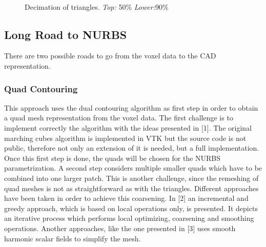 \begin{figure}
\centering
   \\
   \caption{Decimation of triangles. \textit{Top:} 50\% \textit{Lower:}90\%}
   \label{fig:Decimation}
\end{figure}

\subsection{Long Road to NURBS}
There are two possible roads to go from the voxel data to the CAD representation.
\subsubsection{Quad Contouring}
This approach uses the dual contouring algorithm as first step in order to obtain a quad mesh
representation from the voxel data. The first challenge is to implement correctly the algorithm
with the ideas presented in [1]. The original marching cubes algorithm is
implemented in VTK but the source code is not public, therefore not only an extension
of it is needed, but a full implementation. Once this first step is done, the quads will be chosen for the
NURBS parametrization. A second step considers multiple smaller quads which have to be
combined into one larger patch. This is another challenge, since the remeshing of quad meshes
is not as straightforward as with the triangles. Different approaches have been taken in order to
achieve this coarsening. In [2] an incremental and greedy approach, which is based on local operations only, is presented. It depicts an iterative process which performs local optimizing, coarsening and smoothing operations. Another approaches, like
the one presented in [3] uses smooth harmonic scalar fields to simplify the mesh.


